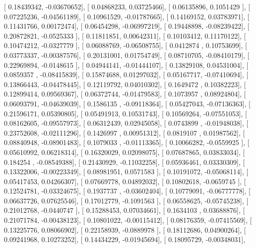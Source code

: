 \documentclass{article}
\begin{document}
       [ 0.18439342, -0.03670652],
       [ 0.04868233,  0.03725466],
       [ 0.06135896,  0.1051429 ],
       [ 0.07225236, -0.04561189],
       [ 0.10961529, -0.01787665],
       [ 0.14169152,  0.03783971],
       [ 0.11431766,  0.00172474],
       [ 0.06454298, -0.06997219],
       [ 0.19448898, -0.08239422],
       [ 0.20872821, -0.0525333 ],
       [ 0.11811851,  0.00642311],
       [ 0.10103412,  0.11170122],
       [ 0.10474212, -0.0327779 ],
       [ 0.06088769, -0.06508755],
       [ 0.0412874 ,  0.10753699],
       [ 0.03773337, -0.00387576],
       [ 0.20131001,  0.01754749],
       [ 0.08710705, -0.08410179],
       [ 0.22969894, -0.0148615 ],
       [ 0.04944141, -0.01444107],
       [ 0.13829108,  0.04531004],
       [ 0.0859357 , -0.08415839],
       [ 0.15874688,  0.01297032],
       [ 0.05167717, -0.07410694],
       [ 0.13866443, -0.04478445],
       [ 0.12119792,  0.04010302],
       [ 0.1649472 ,  0.10382223],
       [ 0.12899414,  0.09569367],
       [ 0.06372744, -0.01479583],
       [ 0.1073957 ,  0.08924804],
       [ 0.06093791, -0.04639039],
       [ 0.1586135 , -0.09118364],
       [ 0.05427043, -0.07136363],
       [ 0.21596171,  0.05390805],
       [ 0.05491913,  0.10531743],
       [ 0.10569264, -0.07551053],
       [ 0.08162605, -0.09557973],
       [ 0.06312439,  0.02945058],
       [ 0.0743899 , -0.01948038],
       [ 0.23752608, -0.02111296],
       [ 0.1426997 ,  0.00951312],
       [ 0.0819107 ,  0.01987562],
       [ 0.08840948, -0.08901483],
       [ 0.1079033 , -0.01113365],
       [ 0.10066282, -0.0559925 ],
       [ 0.05610992,  0.06218314],
       [ 0.16320029,  0.02098075],
       [ 0.07687865,  0.03833034],
       [ 0.184254  , -0.08549388],
       [ 0.21430929, -0.11032258],
       [ 0.05936461,  0.03330309],
       [ 0.13322006, -0.00223349],
       [ 0.08981951,  0.0571583 ],
       [ 0.10191072, -0.05068114],
       [ 0.05417453,  0.04266307],
       [ 0.07669778,  0.04892032],
       [ 0.10802618, -0.0659745 ],
       [ 0.12524781, -0.03324675],
       [ 0.1937737 , -0.03602404],
       [ 0.10779091, -0.06777778],
       [ 0.06637726,  0.07625546],
       [ 0.17012779, -0.1091563 ],
       [ 0.06558625, -0.05745238],
       [ 0.21012768, -0.0440747 ],
       [ 0.15288453,  0.07034661],
       [ 0.1634103 ,  0.03688876],
       [ 0.21071784, -0.00438123],
       [ 0.10801022, -0.00115412],
       [ 0.08176359, -0.07415569],
       [ 0.13225776,  0.08066902],
       [ 0.22158939, -0.0889978 ],
       [ 0.18112686,  0.04900264],
       [ 0.09241968,  0.10273252],
       [ 0.14434229, -0.01945694],
       [ 0.18095729, -0.00348031],
\end{document}
